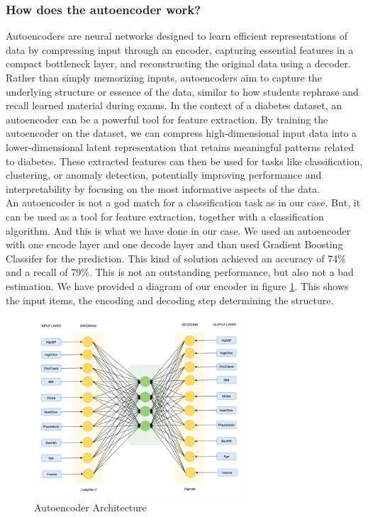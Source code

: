\subsubsection{How does the autoencoder work?}
Autoencoders are neural networks designed to learn efficient representations of data by compressing input through an encoder, capturing essential features in a compact bottleneck layer, and reconstructing the original data using a decoder. Rather than simply memorizing inputs, autoencoders aim to capture the underlying structure or essence of the data, similar to how students rephrase and recall learned material during exams. In the context of a diabetes dataset, an autoencoder can be a powerful tool for feature extraction. By training the autoencoder on the dataset, we can compress high-dimensional input data into a lower-dimensional latent representation that retains meaningful patterns related to diabetes. These extracted features can then be used for tasks like classification, clustering, or anomaly detection, potentially improving performance and interpretability by focusing on the most informative aspects of the data.\\

\noindent An autoencoder is not a god match for a classification task as in our case. But, it can be used as a tool for feature extraction, together with a classification algorithm. And this is what we have done in our case. We used an autoencoder with one encode layer and one decode layer and than used Gradient Boosting Classifer for the prediction. This kind of solution achieved an accuracy of 74$\%$ and a recall of 79$\%$. This is not an outstanding performance, but also not a bad estimation.
We have provided a diagram of our encoder in figure \ref{fig:autoencoder}. This shows the input items, the encoding and decoding step determining the structure.\\


\begin{figure}[h]
    \centering
    \includegraphics[width=0.7\textwidth]{images/autoencoder.png}
    \caption{Autoencoder Architecture}
    \label{fig:autoencoder}
\end{figure}

